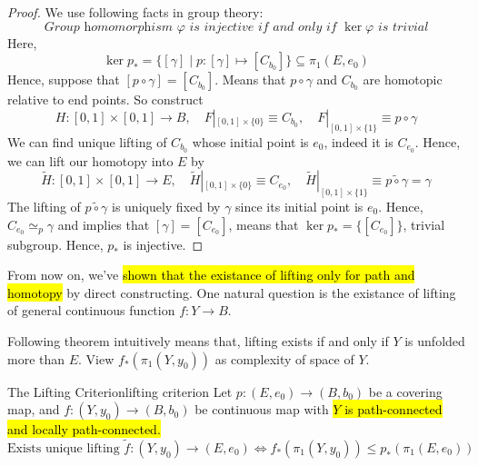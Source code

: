 \documentclass[12pt, a4paper, twoside]{article}
\theoremstyle{plain}
\begin{document}
\begin{proof}
    We use following facts in group theory: 
    \[\textit{Group homomorphism $\varphi$ is injective if and only if $\ker \varphi$ is trivial}\]
    Here, 
    \[\ker{p_*} = \{[\gamma] \mid p: [\gamma] \mapsto [C_{b_0}] \} \subseteq \pi_1(E, e_0)\]
    Hence, suppose that $[p \circ \gamma] = [C_{b_0}]$. Means that $p \circ \gamma$ and $C_{b_0}$ are 
    homotopic relative to end points. So construct 
    \[H: [0,1] \times [0,1] \rightarrow B, \quad F|_{[0,1] \times \{0\}} \equiv C_{b_0}, \quad F|_{[0,1] \times \{1\}} \equiv p \circ \gamma\]
    We can find unique lifting of $C_{b_0}$ whose initial point is $e_0$, indeed it is $C_{e_0}$. 
    Hence, we can lift our homotopy into $E$ by 
    \[\tilde{H}: [0,1] \times [0,1] \rightarrow E, \quad \tilde{H}|_{[0,1] \times \{0\}} \equiv C_{e_0}, \quad \tilde{H}|_{[0,1] \times \{1\}} \equiv \widetilde{p \circ \gamma} = \gamma\]
    The lifting of $\widetilde{p \circ \gamma}$ is uniquely fixed by $\gamma$ since its initial point is $e_0$. 
    Hence, $C_{e_0} \simeq_p \gamma$ and implies that $[\gamma] = [C_{e_0}]$, means that $\ker{p_*} = \{[C_{e_0}]\}$, trivial subgroup.
    Hence, $p_*$ is injective. 
\end{proof}

From now on, we've \hl{shown that the existance of lifting only for path and homotopy} by direct constructing. 
One natural question is the existance of lifting of general continuous function $f: Y \rightarrow B$. 

Following theorem intuitively means that, lifting exists if and only if $Y$ is unfolded more than $E$. 
View $f_*(\pi_1(Y, y_0))$ as complexity of space of $Y$. 

\begin{thm}{The Lifting Criterion}{lifting criterion}
    Let $p: (E, e_0) \rightarrow (B, b_0)$ be a covering map, and $f: (Y, y_0) \rightarrow (B, b_0)$ be continuous map with \hl{$Y$ is path-connected and locally path-connected.}
    \[\text{Exists unique lifting } \tilde{f}: (Y, y_0) \rightarrow (E, e_0) \iff f_*(\pi_1(Y, y_0)) \leq p_*(\pi_1(E, e_0))\]
\end{thm}
\end{document}
